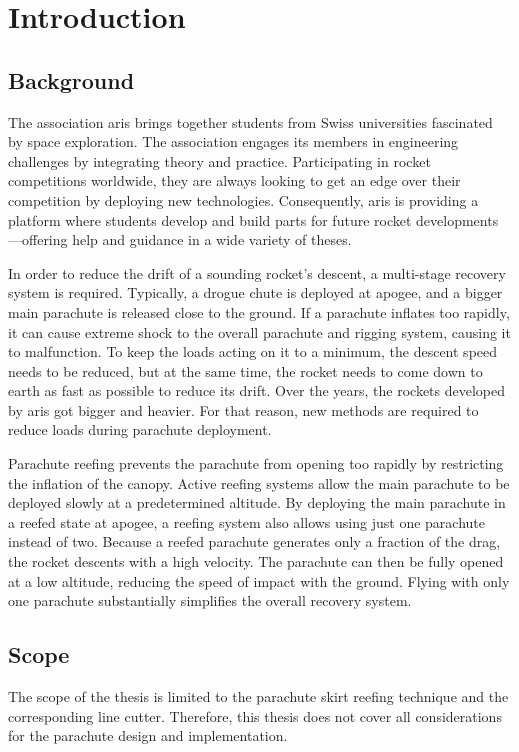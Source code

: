 \newcommand{\package}{\emph}

\chapter{Introduction}
\section{Background}
The association \acrfull{aris} brings together students from Swiss universities fascinated by space exploration. The association engages its members in engineering challenges by integrating theory and practice. Participating in rocket competitions worldwide, they are always looking to get an edge over their competition by deploying new technologies. Consequently, \acrshort{aris} is providing a platform where students develop and build parts for future rocket developments—offering help and guidance in a wide variety of theses.

In order to reduce the drift of a sounding rocket’s descent, a multi-stage recovery system is required. Typically, a drogue chute is deployed at apogee, and a bigger main parachute is released close to the ground. If a parachute inflates too rapidly, it can cause extreme shock to the overall parachute and rigging system, causing it to malfunction. To keep the loads acting on it to a minimum, the descent speed needs to be reduced, but at the same time, the rocket needs to come down to earth as fast as possible to reduce its drift. Over the years, the rockets developed by \acrshort{aris} got bigger and heavier. For that reason, new methods are required to reduce loads during parachute deployment.

Parachute reefing prevents the parachute from opening too rapidly by restricting the inflation of the canopy. Active reefing systems allow the main parachute to be deployed slowly at a predetermined altitude. By deploying the main parachute in a reefed state at apogee, a reefing system also allows using just one parachute instead of two. Because a reefed parachute generates only a fraction of the drag, the rocket descents with a high velocity. The parachute can then be fully opened at a low altitude, reducing the speed of impact with the ground. Flying with only one parachute substantially simplifies the overall recovery system.

\newpage

\section{Scope}
The scope of the thesis is limited to the parachute skirt reefing technique and the corresponding line cutter. Therefore, this thesis does not cover all considerations for the parachute design and implementation.

